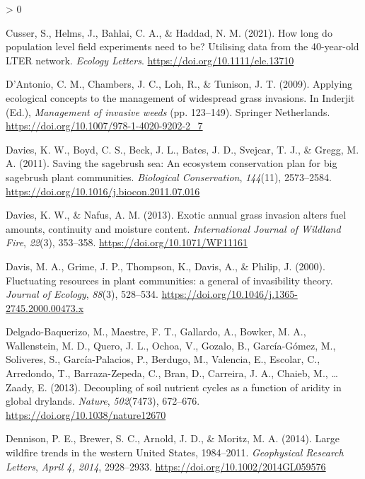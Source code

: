 \documentclass[
  11pt,
  a4paper,
]{article}
\newlength{\cslhangindent}
\newenvironment{CSLReferences}[2] %
 {%
  \setlength{\parindent}{0pt}
  \ifodd #1 \everypar{\setlength{\hangindent}{\cslhangindent}}\ignorespaces\fi
  \ifnum #2 > 0
  \setlength{\parskip}{#2\baselineskip}
  \fi
 }%
 {}
\begin{document}
\begin{CSLReferences}{1}{0}
\leavevmode\hypertarget{ref-Cusser2021}{}%
Cusser, S., Helms, J., Bahlai, C. A., \& Haddad, N. M. (2021). {How long do population level field experiments need to be? Utilising data from the 40-year-old LTER network}. \emph{Ecology Letters}. \url{https://doi.org/10.1111/ele.13710}

\leavevmode\hypertarget{ref-DAntonio2009}{}%
D'Antonio, C. M., Chambers, J. C., Loh, R., \& Tunison, J. T. (2009). Applying ecological concepts to the management of widespread grass invasions. In Inderjit (Ed.), \emph{Management of invasive weeds} (pp. 123--149). Springer Netherlands. \url{https://doi.org/10.1007/978-1-4020-9202-2_7}

\leavevmode\hypertarget{ref-Davies2011}{}%
Davies, K. W., Boyd, C. S., Beck, J. L., Bates, J. D., Svejcar, T. J., \& Gregg, M. A. (2011). {Saving the sagebrush sea: An ecosystem conservation plan for big sagebrush plant communities}. \emph{Biological Conservation}, \emph{144}(11), 2573--2584. \url{https://doi.org/10.1016/j.biocon.2011.07.016}

\leavevmode\hypertarget{ref-Davies2013}{}%
Davies, K. W., \& Nafus, A. M. (2013). {Exotic annual grass invasion alters fuel amounts, continuity and moisture content}. \emph{International Journal of Wildland Fire}, \emph{22}(3), 353--358. \url{https://doi.org/10.1071/WF11161}

\leavevmode\hypertarget{ref-Davis2000}{}%
Davis, M. A., Grime, J. P., Thompson, K., Davis, A., \& Philip, J. (2000). {Fluctuating resources in plant communities: a general of invasibility theory}. \emph{Journal of Ecology}, \emph{88}(3), 528--534. \url{https://doi.org/10.1046/j.1365-2745.2000.00473.x}

\leavevmode\hypertarget{ref-Delgado-Baquerizo2013}{}%
Delgado-Baquerizo, M., Maestre, F. T., Gallardo, A., Bowker, M. A., Wallenstein, M. D., Quero, J. L., Ochoa, V., Gozalo, B., García-Gómez, M., Soliveres, S., García-Palacios, P., Berdugo, M., Valencia, E., Escolar, C., Arredondo, T., Barraza-Zepeda, C., Bran, D., Carreira, J. A., Chaieb, M., \ldots{} Zaady, E. (2013). {Decoupling of soil nutrient cycles as a function of aridity in global drylands}. \emph{Nature}, \emph{502}(7473), 672--676. \url{https://doi.org/10.1038/nature12670}

\leavevmode\hypertarget{ref-Dennison2014}{}%
Dennison, P. E., Brewer, S. C., Arnold, J. D., \& Moritz, M. A. (2014). {Large wildfire trends in the western United States, 1984--2011}. \emph{Geophysical Research Letters}, \emph{April 4, 2014}, 2928--2933. \url{https://doi.org/10.1002/2014GL059576}


\end{CSLReferences}
\end{document}
